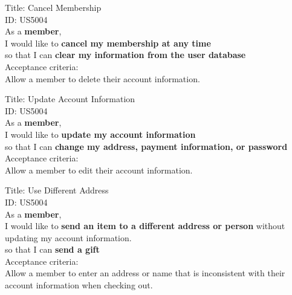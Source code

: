 \documentclass{article}
\begin{document}
\begin{framed}
\noindent
Title:  Cancel Membership \\
ID: US5004 \\
As a \textbf{member},\\
\textbullet  \quad \quad I would like to \textbf{cancel my membership at any time}\\ 
\textbullet  \quad \quad so that I can \textbf{clear my information from the user database}\\
Acceptance criteria: \\
\textbullet  \quad \quad Allow a member to delete their account information.
\end{framed}


\begin{framed}
\noindent
Title:  Update Account Information \\
ID: US5004 \\
As a \textbf{member},\\
\textbullet  \quad \quad I would like to \textbf{update my account information}\\ 
\textbullet  \quad \quad so that I can \textbf{change my address, payment information, or password}\\
Acceptance criteria: \\
\textbullet  \quad \quad Allow a member to edit their account information.
\end{framed}


\begin{framed}
\noindent
Title:  Use Different Address \\
ID: US5004 \\
As a \textbf{member},\\
\textbullet  \quad \quad I would like to \textbf{send an item to a different address or person} without updating my account information.\\
\textbullet  \quad \quad so that I can \textbf{send a gift}\\
Acceptance criteria: \\
\textbullet  \quad \quad Allow a member to enter an address or name that is inconsistent with their account information when checking out.
\end{framed}
\end{document}
